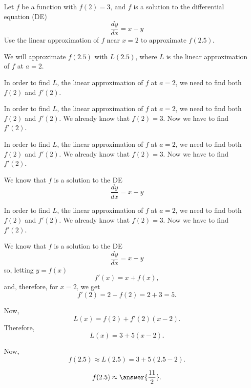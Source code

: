 \documentclass{ximera}
\author{Steven Gubkin\and Nela Lakos}
\begin{document}
\begin{exercise}

Let $f$ be a function with $f(2) = 3$, and $f$ is a solution to the
differential equation (DE)
\[
\frac{dy}{dx} = x+y
\]
Use the linear approximation of $f$ near $x=2$ to approximate $f(2.5)$. 
\begin{hint}
We will approximate $f(2.5)$ with $L(2.5)$, where $L$ is the linear approximation of $f$ at $a=2$.
\end{hint}
\begin{hint}
In order to find $L$, the linear approximation of $f$ at $a=2$, we need to find both $f(2)$ and $f'(2)$.
\end{hint}
\begin{hint}
In order to find $L$, the linear approximation of $f$ at $a=2$, we need to find both $f(2)$ and $f'(2)$.
We already know that $f(2)=3$. Now we have to find $f'(2)$.
\end{hint}
\begin{hint}
In order to find $L$, the linear approximation of $f$ at $a=2$, we need to find both $f(2)$ and $f'(2)$.
We already know that $f(2)=3$. Now we have to find $f'(2)$.

We know that $f$ is a solution to the DE
\[
\frac{dy}{dx} = x+y
\]
\end{hint}

\begin{hint}
In order to find $L$, the linear approximation of $f$ at $a=2$, we need to find both $f(2)$ and $f'(2)$.
We already know that $f(2)=3$. Now we have to find $f'(2)$.

We know that $f$ is a solution to the DE
\[
\frac{dy}{dx} = x+y
\]
so, letting $y=f(x)$
\[
f'(x)= x+f(x),
\]
and, therefore, for $x=2$, we get
\[
f'(2)= 2+f(2)=2+3=5.
\]
\end{hint}
\begin{hint}
Now, 
\[
L(x)=f(2)+f'(2)(x-2).
\]
Therefore,
\[
L(x)=3+5(x-2).
\]
\end{hint}
\begin{hint}
Now, 
\[
f(2.5)\approx L(2.5)=3+5(2.5-2).
\]
\end{hint}
\[
f(2.5)\approx \answer{\frac{11}{2}}.
\]
\end{exercise}
\end{document}

